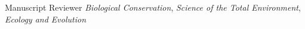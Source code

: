 
\begin{cvskills}
  \cvskill
    {Manuscript Reviewer} %
    {\emph{Biological Conservation}, \emph{Science of the Total Environment}, \emph{Ecology and Evolution}} %
\end{cvskills}
